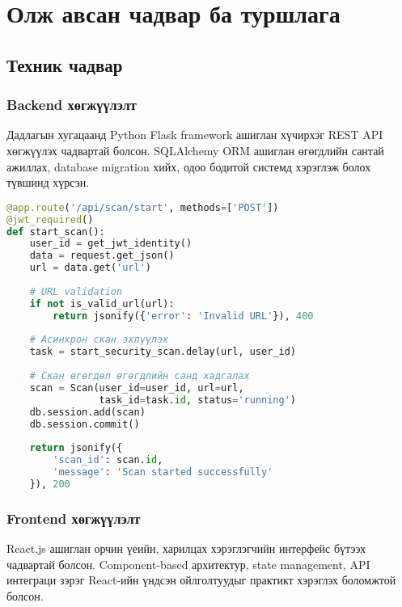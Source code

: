 \documentclass[main.tex]{subfiles}
\begin{document}
\section{Олж авсан чадвар ба туршлага}

\subsection{Техник чадвар}

\subsubsection{Backend хөгжүүлэлт}
Дадлагын хугацаанд Python Flask framework ашиглан хүчирхэг REST API хөгжүүлэх чадвартай болсон. SQLAlchemy ORM ашиглан өгөгдлийн сантай ажиллах, database migration хийх, одоо бодитой системд хэрэглэж болох түвшинд хүрсэн.

\begin{lstlisting}[language=Python, caption=Хөгжүүлсэн API endpoint-ийн жишээ]
@app.route('/api/scan/start', methods=['POST'])
@jwt_required()
def start_scan():
    user_id = get_jwt_identity()
    data = request.get_json()
    url = data.get('url')
    
    # URL validation
    if not is_valid_url(url):
        return jsonify({'error': 'Invalid URL'}), 400
    
    # Асинхрон скан эхлүүлэх
    task = start_security_scan.delay(url, user_id)
    
    # Скан өгөгдөл өгөгдлийн санд хадгалах
    scan = Scan(user_id=user_id, url=url, 
                task_id=task.id, status='running')
    db.session.add(scan)
    db.session.commit()
    
    return jsonify({
        'scan_id': scan.id,
        'message': 'Scan started successfully'
    }), 200
\end{lstlisting}

\subsubsection{Frontend хөгжүүлэлт}
React.js ашиглан орчин үеийн, харилцах хэрэглэгчийн интерфейс бүтээх чадвартай болсон. Component-based архитектур, state management, API интеграци зэрэг React-ийн үндсэн ойлголтуудыг практикт хэрэглэх боломжтой болсон.
\end{document}
